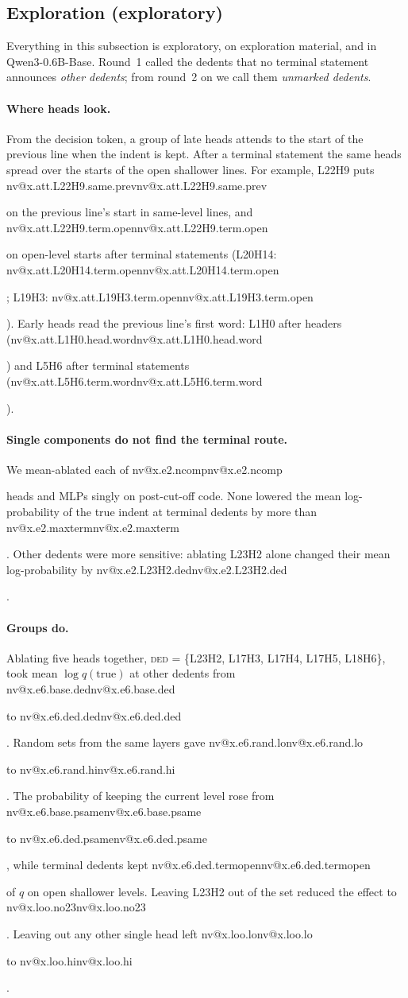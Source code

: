 \documentclass[11pt]{article}
\makeatletter
\newcommand{\nv}[1]{\ifcsname nv@#1\endcsname\csname nv@#1\endcsname\else\PackageError{numbers}{Unknown number key #1}{}\fi}
\newcommand{\qw}{Qwen3-0.6B-Base}
\newcommand{\hd}[2]{L#1H#2}
\newcommand{\ded}{\textsc{ded}}
\makeatother
\begin{document}
\subsection{Exploration (exploratory)}

Everything in this subsection is exploratory, on exploration material, and in \qw{}. Round~1 called the dedents that no terminal statement announces \emph{other dedents}; from round~2 on we call them \emph{unmarked dedents}.

\paragraph{Where heads look.} From the decision token, a group of late heads attends to the start of the previous line when the indent is kept. After a terminal statement the same heads spread over the starts of the open shallower lines. For example, \hd{22}{9} puts \nv{x.att.L22H9.same.prev} on the previous line's start in same-level lines, and \nv{x.att.L22H9.term.open} on open-level starts after terminal statements (\hd{20}{14}: \nv{x.att.L20H14.term.open}; \hd{19}{3}: \nv{x.att.L19H3.term.open}). Early heads read the previous line's first word: \hd{1}{0} after headers (\nv{x.att.L1H0.head.word}) and \hd{5}{6} after terminal statements (\nv{x.att.L5H6.term.word}).

\paragraph{Single components do not find the terminal route.} We mean-ablated each of \nv{x.e2.ncomp} heads and MLPs singly on post-cut-off code. None lowered the mean log-probability of the true indent at terminal dedents by more than \nv{x.e2.maxterm}. Other dedents were more sensitive: ablating \hd{23}{2} alone changed their mean log-probability by \nv{x.e2.L23H2.ded}.

\paragraph{Groups do.} Ablating five heads together, \ded{} = \{\hd{23}{2}, \hd{17}{3}, \hd{17}{4}, \hd{17}{5}, \hd{18}{6}\}, took mean $\log q(\text{true})$ at other dedents from \nv{x.e6.base.ded} to \nv{x.e6.ded.ded}. Random sets from the same layers gave \nv{x.e6.rand.lo} to \nv{x.e6.rand.hi}. The probability of keeping the current level rose from \nv{x.e6.base.psame} to \nv{x.e6.ded.psame}, while terminal dedents kept \nv{x.e6.ded.termopen} of $q$ on open shallower levels. Leaving \hd{23}{2} out of the set reduced the effect to \nv{x.loo.no23}. Leaving out any other single head left \nv{x.loo.lo} to \nv{x.loo.hi}.
\end{document}
